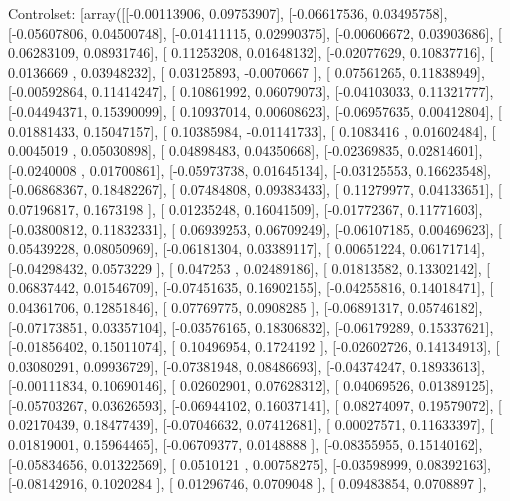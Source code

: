 \documentclass{article}
\begin{document}
Controlset: [array([[-0.00113906,  0.09753907],
       [-0.06617536,  0.03495758],
       [-0.05607806,  0.04500748],
       [-0.01411115,  0.02990375],
       [-0.00606672,  0.03903686],
       [ 0.06283109,  0.08931746],
       [ 0.11253208,  0.01648132],
       [-0.02077629,  0.10837716],
       [ 0.0136669 ,  0.03948232],
       [ 0.03125893, -0.0070667 ],
       [ 0.07561265,  0.11838949],
       [-0.00592864,  0.11414247],
       [ 0.10861992,  0.06079073],
       [-0.04103033,  0.11321777],
       [-0.04494371,  0.15390099],
       [ 0.10937014,  0.00608623],
       [-0.06957635,  0.00412804],
       [ 0.01881433,  0.15047157],
       [ 0.10385984, -0.01141733],
       [ 0.1083416 ,  0.01602484],
       [ 0.0045019 ,  0.05030898],
       [ 0.04898483,  0.04350668],
       [-0.02369835,  0.02814601],
       [-0.0240008 ,  0.01700861],
       [-0.05973738,  0.01645134],
       [-0.03125553,  0.16623548],
       [-0.06868367,  0.18482267],
       [ 0.07484808,  0.09383433],
       [ 0.11279977,  0.04133651],
       [ 0.07196817,  0.1673198 ],
       [ 0.01235248,  0.16041509],
       [-0.01772367,  0.11771603],
       [-0.03800812,  0.11832331],
       [ 0.06939253,  0.06709249],
       [-0.06107185,  0.00469623],
       [ 0.05439228,  0.08050969],
       [-0.06181304,  0.03389117],
       [ 0.00651224,  0.06171714],
       [-0.04298432,  0.0573229 ],
       [ 0.047253  ,  0.02489186],
       [ 0.01813582,  0.13302142],
       [ 0.06837442,  0.01546709],
       [-0.07451635,  0.16902155],
       [-0.04255816,  0.14018471],
       [ 0.04361706,  0.12851846],
       [ 0.07769775,  0.0908285 ],
       [-0.06891317,  0.05746182],
       [-0.07173851,  0.03357104],
       [-0.03576165,  0.18306832],
       [-0.06179289,  0.15337621],
       [-0.01856402,  0.15011074],
       [ 0.10496954,  0.1724192 ],
       [-0.02602726,  0.14134913],
       [ 0.03080291,  0.09936729],
       [-0.07381948,  0.08486693],
       [-0.04374247,  0.18933613],
       [-0.00111834,  0.10690146],
       [ 0.02602901,  0.07628312],
       [ 0.04069526,  0.01389125],
       [-0.05703267,  0.03626593],
       [-0.06944102,  0.16037141],
       [ 0.08274097,  0.19579072],
       [ 0.02170439,  0.18477439],
       [-0.07046632,  0.07412681],
       [ 0.00027571,  0.11633397],
       [ 0.01819001,  0.15964465],
       [-0.06709377,  0.0148888 ],
       [-0.08355955,  0.15140162],
       [-0.05834656,  0.01322569],
       [ 0.0510121 ,  0.00758275],
       [-0.03598999,  0.08392163],
       [-0.08142916,  0.1020284 ],
       [ 0.01296746,  0.0709048 ],
       [ 0.09483854,  0.0708897 ],
\end{document}
